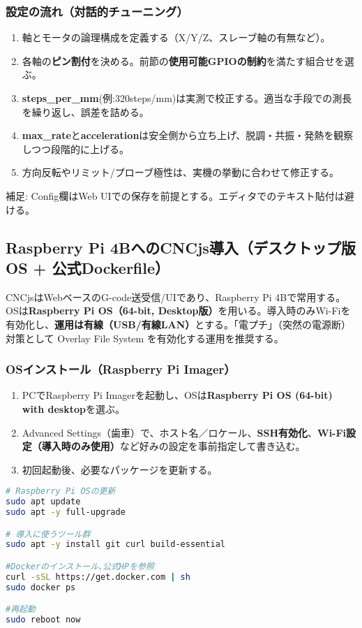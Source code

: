 \documentclass[uplatex,dvipdfmx]{ujarticle}
\begin{document}
\subsubsection*{設定の流れ（対話的チューニング）}
\begin{enumerate}
\item 軸とモータの論理構成を定義する（X/Y/Z、スレーブ軸の有無など）。
\item 各軸の\textbf{ピン割付}を決める。前節の\textbf{使用可能GPIOの制約}を満たす組合せを選ぶ。
\item \textbf{steps\_per\_mm}(例:320steps/mm)は実測で校正する。適当な手段での測長を繰り返し、誤差を詰める。
\item \textbf{max\_rate}と\textbf{acceleration}は安全側から立ち上げ、脱調・共振・発熱を観察しつつ段階的に上げる。
\item 方向反転やリミット/プローブ極性は、実機の挙動に合わせて修正する。
\end{enumerate}

\noindent 補足: Config欄はWeb UIでの保存を前提とする。エディタでのテキスト貼付は避ける。

\subsection{Raspberry Pi 4BへのCNCjs導入（デスクトップ版OS + 公式Dockerfile）}

CNCjsはWebベースのG-code送受信/UIであり、Raspberry Pi 4Bで常用する。OSは\textbf{Raspberry Pi OS（64-bit, Desktop版）}を用いる。導入時のみWi-Fiを有効化し、\textbf{運用は有線（USB/有線LAN）}とする。「電プチ」（突然の電源断）対策として Overlay File System を有効化する運用を推奨する。

\subsubsection*{OSインストール（Raspberry Pi Imager）}
\begin{enumerate}
\item PCでRaspberry Pi Imagerを起動し、OSは\textbf{Raspberry Pi OS (64-bit) with desktop}を選ぶ。
\item Advanced Settings（歯車）で、ホスト名／ロケール、\textbf{SSH有効化}、\textbf{Wi-Fi設定（導入時のみ使用）}など好みの設定を事前指定して書き込む。
\item 初回起動後、必要なパッケージを更新する。
\end{enumerate}

\begin{lstlisting}[caption=初期パッケージ導入（APT）, label=code:apt-init, language=bash]
# Raspberry Pi OSの更新
sudo apt update
sudo apt -y full-upgrade

# 導入に使うツール群
sudo apt -y install git curl build-essential 

#Dockerのインストール､公式HPを参照
curl -sSL https://get.docker.com | sh
sudo docker ps

#再起動
sudo reboot now
\end{lstlisting}
\end{document}
